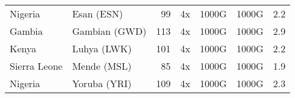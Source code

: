 \begin{table}[htp]
\begin{tabular}{llrrllr}
Nigeria & Esan (ESN) & 99 & 4x & 1000G & 1000G & 2.2 \\
Gambia & Gambian (GWD) & 113 & 4x & 1000G & 1000G & 2.9 \\
Kenya & Luhya (LWK) & 101 & 4x & 1000G & 1000G & 2.2 \\
Sierra Leone & Mende (MSL) & 85 & 4x & 1000G & 1000G & 1.9 \\
Nigeria & Yoruba (YRI) & 109 & 4x & 1000G & 1000G & 2.3 \\

\end{tabular}
\end{table}

